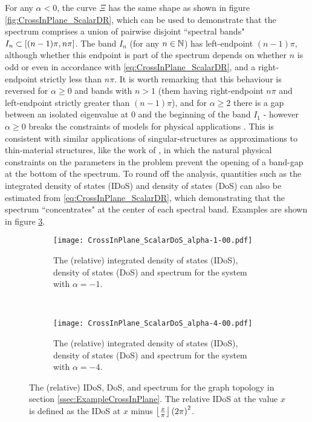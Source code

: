 For any $\alpha<0$, the curve $\Xi$ has the same shape as shown in figure \ref{fig:CrossInPlane_ScalarDR}, which can be used to demonstrate that the spectrum comprises a union of pairwise disjoint ``spectral bands" $I_n\subset\left[ (n-1)\pi, n\pi \right]$.
The band $I_n$ (for any $n\in\mathbb{N}$) has left-endpoint $(n-1)\pi$, although whether this endpoint is part of the spectrum depends on whether $n$ is odd or even in accordance with \eqref{eq:CrossInPlane_ScalarDR}, and a right-endpoint strictly less than $n\pi$.
It is worth remarking that this behaviour is reversed for $\alpha\geq 0$ and bands with $n>1$ (them having right-endpoint $n\pi$ and left-endpoint strictly greater than $(n-1)\pi$), and for $\alpha\geq2$ there is a gap between an isolated eigenvalue at $0$ and the beginning of the band $I_1$ - however $\alpha\geq0$ breaks the constraints of models for physical applications .
This is consistent with similar applications of singular-structures as approximations to thin-material structures, like the work of \cite{cherednichenko2019time}, in which the natural physical constraints on the parameters in the problem prevent the opening of a band-gap at the bottom of the spectrum.
To round off the analysis, quantities such as the integrated density of states (IDoS) and density of states (DoS) can also be estimated from \eqref{eq:CrossInPlane_ScalarDR}, which demonstrating that the spectrum ``concentrates" at the center of each spectral band.
Examples are shown in figure \ref{fig:CrossInPlane_ScalarDoS}.
\begin{figure}[h]
	\begin{subfigure}[t]{0.45\textwidth}
		\centering
		\texttt{[image: CrossInPlane\_ScalarDoS\_alpha-1-00.pdf]}
		\caption{\label{fig:CrossInPlane_ScalarDoS_alpha-1-00} The (relative) integrated density of states (IDoS), density of states (DoS) and spectrum for the system with $\alpha=-1$.}
	\end{subfigure}
	~
	\begin{subfigure}[t]{0.45\textwidth}
		\centering
		\texttt{[image: CrossInPlane\_ScalarDoS\_alpha-4-00.pdf]}
		\caption{\label{fig:CrossInPlane_ScalarDoS_alpha-4-00} The (relative) integrated density of states (IDoS), density of states (DoS) and spectrum for the system with $\alpha=-4$.}
	\end{subfigure}	
	\caption{\label{fig:CrossInPlane_ScalarDoS} The (relative) IDoS, DoS, and spectrum for the graph topology in section \ref{ssec:ExampleCrossInPlane}.
	The relative IDoS at the value $x$ is defined as the IDoS at $x$ minus $\left\lfloor\frac{x}{\pi}\right\rfloor\left( 2\pi \right)^2$.}
\end{figure}